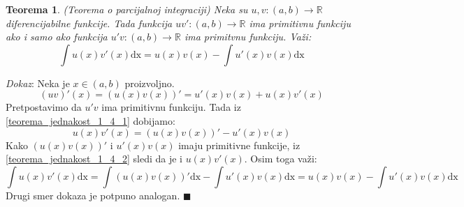 \documentclass{article}
\newtheorem{teorema}{Teorema}[section]
\begin{document}
\setcounter{equation}{0}
\begin{teoremabox}
    \begin{teorema} \label{teorema_1.4}
        (Teorema o parcijalnoj integraciji) Neka su
        $u, v: (a, b) \longrightarrow \mathbb{R}$ diferencijabilne
        funkcije. Tada funkcija $u v':(a, b) \longrightarrow \mathbb{R}$
        ima primitivnu funkciju ako i samo ako funkcija $u' v: (a, b) \longrightarrow \mathbb{R}$
        ima primitvnu funkciju. Važi:
        $$\int u(x)v'(x)\text{dx} = u(x)v(x) -\int u'(x)v(x)\text{dx}$$
    \end{teorema}
\end{teoremabox}
\textit{Dokaz}: Neka je $x \in (a, b)$ proizvoljno.
\begin{equation}\label{teorema_jednakost_1_4_1}
    (uv)'(x) = (u(x) v(x))' = u'(x)v(x) + u(x)v'(x)
\end{equation}
Pretpostavimo da $u'v$ ima primitivnu funkciju. Tada iz \eqref{teorema_jednakost_1_4_1} dobijamo:
\begin{equation}\label{teorema_jednakost_1_4_2}
    u(x)v'(x) = (u(x) v(x))' - u'(x)v(x)
\end{equation}
Kako $(u(x)v(x))'$ i $u'(x)v(x)$ imaju primitivne funkcije,
iz \eqref{teorema_jednakost_1_4_2} sledi da je i $u(x)v'(x)$. Osim toga važi:
\begin{equation*}
    \int u(x)v'(x)\text{dx} = \int(u(x)v(x))'\text{dx} - \int u'(x)v(x)\text{dx} = u(x)v(x) -\int u'(x)v(x)\text{dx}
\end{equation*}
Drugi smer dokaza je potpuno analogan.
\null\hfill $\blacksquare$\par
\end{document}

